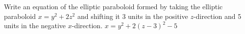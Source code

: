 {Write an equation of the elliptic paraboloid formed by taking the elliptic paraboloid $x=y^2+2z^2$ and shifting it 3 units in the positive $z$-direction and 5 units in the negative $x$-direction.
}
{$x=y^2+2(z-3)^2-5$
}

